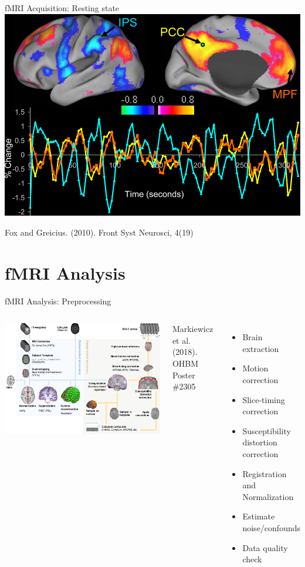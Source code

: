 \documentclass[aspectratio=169,xcolor=dvipsnames]{beamer}
\begin{document}

\begin{frame}{fMRI Acquisition: Resting state}
\includegraphics[width=.7\textwidth]{imgs/restingfmri}

\tiny{Fox and Greicius. (2010). Front Syst Neurosci, 4(19)}
\end{frame}

\section{fMRI Analysis}

\begin{frame}{fMRI Analysis: Preprocessing}
\begin{columns}[c]
\includegraphics[width=1\textwidth]{imgs/preprocess}

\tiny{Markiewicz et al. (2018). OHBM Poster \#2305}

\begin{itemize}
\item Brain extraction
\item Motion correction
\item Slice-timing correction
\item Susceptibility distortion correction
\item Registration and Normalization
\item Estimate noise/confounds
\item Data quality check
\end{itemize}
\end{columns}
\end{frame}
\end{document}
